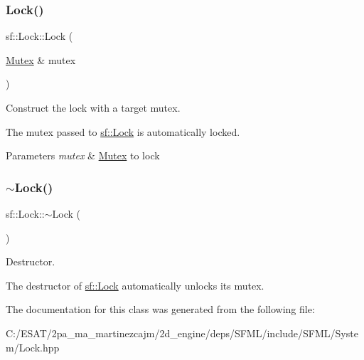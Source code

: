 \subsubsection{\texorpdfstring{Lock()}{Lock()}}
{\footnotesize\ttfamily sf\+::\+Lock\+::\+Lock (\begin{DoxyParamCaption}\item[{\hyperlink{classsf_1_1_mutex}{Mutex} \&}]{mutex }\end{DoxyParamCaption})\hspace{0.3cm}{\ttfamily [explicit]}}



Construct the lock with a target mutex. 

The mutex passed to \hyperlink{classsf_1_1_lock}{sf\+::\+Lock} is automatically locked.


\begin{DoxyParams}{Parameters}
{\em mutex} & \hyperlink{classsf_1_1_mutex}{Mutex} to lock \\
\hline
\end{DoxyParams}
\mbox{\label{classsf_1_1_lock_a8168b36323a18ccf5b6bc531d964aec5}} 
\subsubsection{\texorpdfstring{$\sim$\+Lock()}{~Lock()}}
{\footnotesize\ttfamily sf\+::\+Lock\+::$\sim$\+Lock (\begin{DoxyParamCaption}{ }\end{DoxyParamCaption})}



Destructor. 

The destructor of \hyperlink{classsf_1_1_lock}{sf\+::\+Lock} automatically unlocks its mutex. 

The documentation for this class was generated from the following file\+:\begin{DoxyCompactItemize}
\item 
C\+:/\+E\+S\+A\+T/2pa\+\_\+ma\+\_\+martinezcajm/2d\+\_\+engine/deps/\+S\+F\+M\+L/include/\+S\+F\+M\+L/\+System/Lock.\+hpp\end{DoxyCompactItemize}
